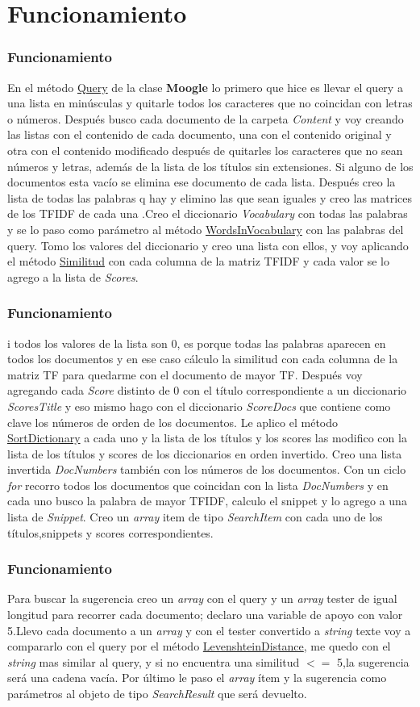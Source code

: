 
\section{Funcionamiento}
\begin{frame}
    \frametitle{Funcionamiento}
    En el método \underline{Query} de la clase \textbf{Moogle} lo primero que hice es llevar el
query a una lista en minúsculas y quitarle todos los caracteres que no
coincidan con letras o números. Después busco cada documento de la
carpeta \emph{Content} y voy creando las listas con el contenido de cada
documento, una con el contenido original y otra con el contenido
modificado después de quitarles los caracteres que no sean números y
letras, además de la lista de los títulos sin extensiones. Si alguno de los
documentos esta vacío se elimina ese documento de cada lista. Después
creo la lista de todas las palabras q hay y elimino las que sean iguales y
creo las matrices de los TFIDF de cada una .Creo el diccionario \emph{Vocabulary}
con todas las palabras y se lo paso como parámetro al método
\underline{WordsInVocabulary} con las palabras del query. Tomo los valores del
diccionario y creo una lista con ellos, y voy aplicando el método \underline{Similitud}
con cada columna de la matriz TFIDF y cada valor se lo agrego a la lista
de \emph{Scores}.
\end{frame}
\begin{frame}
    \frametitle{Funcionamiento}
    i todos los valores de la lista son 0, es porque todas las
palabras aparecen en todos los documentos y en ese caso cálculo la
similitud con cada columna de la matriz TF para quedarme con el
documento de mayor TF. Después voy agregando cada \emph{Score} distinto de
0 con el título correspondiente a un diccionario \emph{ScoresTitle} y eso mismo
hago con el diccionario \emph{ScoreDocs} que contiene como clave los números
de orden de los documentos. Le aplico el método \underline{SortDictionary} a cada
uno y la lista de los títulos y los scores las modifico con la lista de los títulos
y scores de los diccionarios en orden invertido. Creo una lista invertida
\emph{DocNumbers} también con los números de los documentos. Con un ciclo
\emph{for} recorro todos los documentos que coincidan con la lista \emph{DocNumbers} y
en cada uno busco la palabra de mayor TFIDF, calculo el
snippet y lo agrego a una lista de \emph{Snippet}. Creo un \emph{array }item de tipo
\emph{SearchItem} con cada uno de los títulos,snippets y scores
correspondientes.
\end{frame}
\begin{frame}
    \frametitle{Funcionamiento}
    Para buscar la sugerencia creo un \emph{array} con el query y
un \emph{array} tester de igual longitud para recorrer cada documento; declaro una
variable de apoyo con valor 5.Llevo cada documento a un \emph{array} y con el
tester convertido a \emph{string} texte voy a compararlo con el query por el método
\underline{LevenshteinDistance}, me quedo con el \emph{string} mas similar al query, y si no
encuentra una similitud $<=$ 5,la sugerencia será una cadena vacía. Por último le paso el \emph{array} ítem y la sugerencia como parámetros al objeto de
tipo \emph{SearchResult} que será devuelto.
\end{frame}

